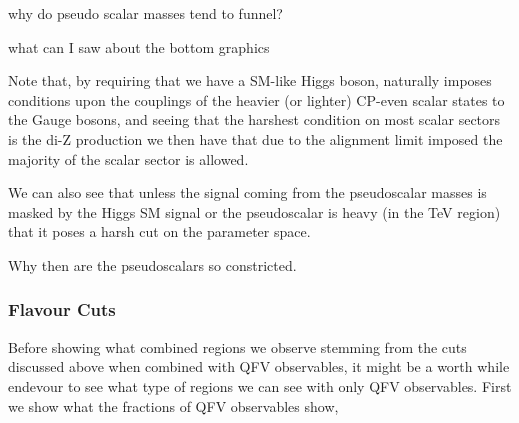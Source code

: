 { \color{red} why do pseudo scalar masses tend to funnel? } 

{ \color{red} what can I saw about the bottom graphics    } 

Note that, by requiring that we have a SM-like Higgs boson, naturally imposes conditions upon the couplings of the heavier (or lighter) CP-even scalar states to the Gauge bosons, and seeing that the harshest condition on most scalar sectors is the di-Z production we then have that due to the alignment limit imposed the majority of the scalar sector is allowed. 

We can also see that unless the signal coming from the pseudoscalar masses is masked by the Higgs SM signal or the pseudoscalar is heavy (in the TeV region) that it poses a harsh cut on the parameter space.

 { \color{red} Why then are the pseudoscalars so constricted. }   

\subsubsection{Flavour Cuts }


Before showing what combined regions we observe stemming from the cuts discussed above when combined with QFV observables, it might be a worth while endevour to see what type of regions we can see with only QFV observables. 
%
First we show what the fractions of QFV observables show,    


